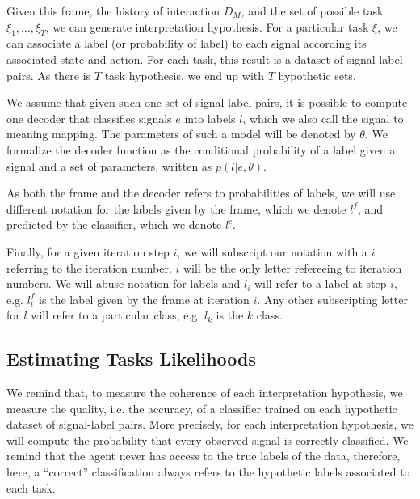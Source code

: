 Given this frame, the history of interaction $D_M$, and the set of possible task $\xi_1,\ldots,\xi_T$, we can generate interpretation hypothesis. For a particular task $\xi$, we can associate a label (or probability of label) to each signal according its associated state and action. For each task, this result is a dataset of signal-label pairs. As there is $T$ task hypothesis, we end up with $T$ hypothetic sets.

We assume that given such one set of signal-label pairs, it is possible to compute one decoder that classifies signals $e$ into labels $l$, which we also call the signal to meaning mapping. The parameters of such a model will be denoted by $\theta$. We formalize the decoder function as the conditional probability of a label given a signal and a set of parameters, written as $p(l|e,\theta)$.

As both the frame and the decoder refers to probabilities of labels, we will use different notation for the labels given by the frame, which we denote $l^f$, and predicted by the classifier, which we denote $l^c$. 

Finally, for a given iteration step $i$, we will subscript our notation with a $i$ referring to the iteration number. $i$ will be the only letter refereeing to iteration numbers. We will abuse notation for labels and $l_i$ will refer to a label at step $i$, e.g. $l^f_i$ is the label given by the frame at iteration $i$. Any other subscripting letter for $l$ will refer to a particular class, e.g. $l_k$ is the $k$ class.


\subsection{Estimating Tasks Likelihoods}
\label{chapter:lfui:likelihood}

We remind that, to measure the coherence of each interpretation hypothesis, we measure the quality, i.e. the accuracy, of a classifier trained on each hypothetic dataset of signal-label pairs. More precisely, for each interpretation hypothesis, we will compute the probability that every observed signal is correctly classified. We remind that the agent never has access to the true labels of the data, therefore, here, a ``correct'' classification always refers to the hypothetic labels associated to each task.

